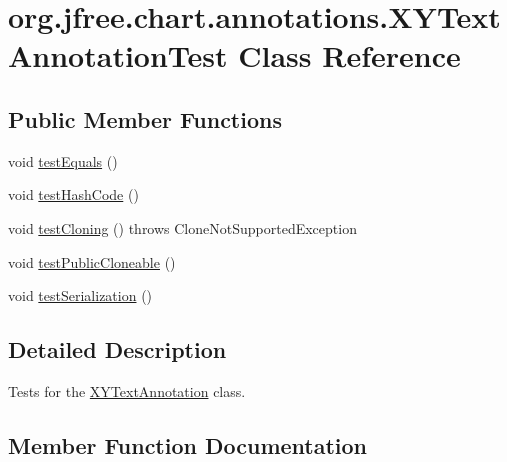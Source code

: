 \hypertarget{classorg_1_1jfree_1_1chart_1_1annotations_1_1_x_y_text_annotation_test}{}\section{org.\+jfree.\+chart.\+annotations.\+X\+Y\+Text\+Annotation\+Test Class Reference}
\label{classorg_1_1jfree_1_1chart_1_1annotations_1_1_x_y_text_annotation_test}
\subsection*{Public Member Functions}
\begin{DoxyCompactItemize}
\item 
void \mbox{\hyperlink{classorg_1_1jfree_1_1chart_1_1annotations_1_1_x_y_text_annotation_test_aff6cb8b1962cd661215eb857709bfa3e}{test\+Equals}} ()
\item 
void \mbox{\hyperlink{classorg_1_1jfree_1_1chart_1_1annotations_1_1_x_y_text_annotation_test_a44802e72b14f86ea5679baccca53c3a3}{test\+Hash\+Code}} ()
\item 
void \mbox{\hyperlink{classorg_1_1jfree_1_1chart_1_1annotations_1_1_x_y_text_annotation_test_a84b0b1f03b46a6dc0cbdfd9d67c89200}{test\+Cloning}} ()  throws Clone\+Not\+Supported\+Exception 
\item 
void \mbox{\hyperlink{classorg_1_1jfree_1_1chart_1_1annotations_1_1_x_y_text_annotation_test_a35a6f40562d83770db7826bbc2833f52}{test\+Public\+Cloneable}} ()
\item 
void \mbox{\hyperlink{classorg_1_1jfree_1_1chart_1_1annotations_1_1_x_y_text_annotation_test_afa9dc15174eec3c1d071744a4edfff2d}{test\+Serialization}} ()
\end{DoxyCompactItemize}


\subsection{Detailed Description}
Tests for the \mbox{\hyperlink{classorg_1_1jfree_1_1chart_1_1annotations_1_1_x_y_text_annotation}{X\+Y\+Text\+Annotation}} class. 

\subsection{Member Function Documentation}
\mbox{\label{classorg_1_1jfree_1_1chart_1_1annotations_1_1_x_y_text_annotation_test_a84b0b1f03b46a6dc0cbdfd9d67c89200}} 
